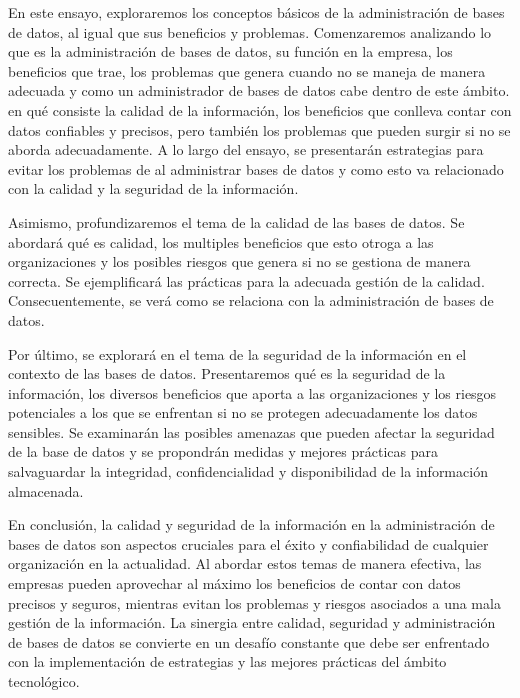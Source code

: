 \documentclass[12pt, article, natbib]{IEEEtran}
\begin{document}
En este ensayo, exploraremos los conceptos básicos de la administración de bases de datos, al igual que sus beneficios y problemas. Comenzaremos analizando lo que es la administración de bases de datos, su función en la empresa, los beneficios que trae, los problemas que genera cuando no se maneja de manera adecuada y como un administrador de bases de datos cabe dentro de este ámbito. en qué consiste la calidad de la información, los beneficios que conlleva contar con datos confiables y precisos, pero también los problemas que pueden surgir si no se aborda adecuadamente. A lo largo del ensayo, se presentarán estrategias para evitar los problemas de al administrar bases de datos y como esto va relacionado con la calidad y la seguridad de la información.

Asimismo, profundizaremos el tema de la calidad de las bases de datos. Se abordará qué es calidad, los multiples beneficios que esto otroga a las organizaciones y los posibles riesgos que genera si no se gestiona de manera correcta. Se ejemplificará las prácticas para la adecuada gestión de la calidad. Consecuentemente, se verá como se relaciona con la administración de bases de datos.

Por último, se explorará en el tema de la seguridad de la información en el contexto de las bases de datos. Presentaremos qué es la seguridad de la información, los diversos beneficios que aporta a las organizaciones y los riesgos potenciales a los que se enfrentan si no se protegen adecuadamente los datos sensibles. Se examinarán las posibles amenazas que pueden afectar la seguridad de la base de datos y se propondrán medidas y mejores prácticas para salvaguardar la integridad, confidencialidad y disponibilidad de la información almacenada.

En conclusión, la calidad y seguridad de la información en la administración de bases de datos son aspectos cruciales para el éxito y confiabilidad de cualquier organización en la actualidad. Al abordar estos temas de manera efectiva, las empresas pueden aprovechar al máximo los beneficios de contar con datos precisos y seguros, mientras evitan los problemas y riesgos asociados a una mala gestión de la información. La sinergia entre calidad, seguridad y administración de bases de datos se convierte en un desafío constante que debe ser enfrentado con la implementación de estrategias y las mejores prácticas del ámbito tecnológico.

\end{document}
